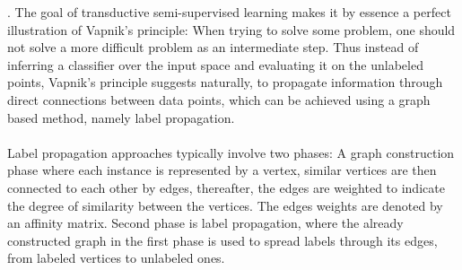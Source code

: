 \documentclass[conference]{IEEEtran}
\begin{document}
\cite{chapelle2009semi}. The goal of transductive semi-supervised learning makes it by essence a perfect illustration of Vapnik's principle: When trying to solve some problem, one should not solve a more difficult problem as an intermediate step. Thus instead of inferring a classifier over the input space and evaluating it on the unlabeled points, Vapnik's principle suggests naturally, to propagate information through direct connections between data points, which can be achieved using a graph based method, namely label propagation. 
\\
\\ Label propagation approaches typically involve two phases: A graph construction phase where each instance is represented by a vertex, similar vertices are then connected to each other by edges, thereafter, the edges are weighted to indicate the degree of similarity between the vertices. The edges weights are denoted by an affinity matrix. Second phase is label propagation, where the already constructed graph in the first phase is used to spread labels through its edges, from labeled vertices to unlabeled ones.
\end{document}
